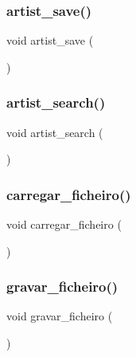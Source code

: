 \mbox{\label{project_8h_a8defa4fde9758146417715dd117615d2}} 
\subsubsection{artist\_save()}
{\footnotesize\ttfamily void artist\+\_\+save (\begin{DoxyParamCaption}{ }\end{DoxyParamCaption})}

\mbox{\label{project_8h_ac92bcae8044b83bc1a51fa19509f1979}} 
\subsubsection{artist\_search()}
{\footnotesize\ttfamily void artist\+\_\+search (\begin{DoxyParamCaption}{ }\end{DoxyParamCaption})}

\mbox{\label{project_8h_aa051eccd196b39b4cc6a67cc0367f198}} 
\subsubsection{carregar\_ficheiro()}
{\footnotesize\ttfamily void carregar\+\_\+ficheiro (\begin{DoxyParamCaption}{ }\end{DoxyParamCaption})}

\mbox{\label{project_8h_a66e40e3c4fe80bd64ffc8f71b2222486}} 
\subsubsection{gravar\_ficheiro()}
{\footnotesize\ttfamily void gravar\+\_\+ficheiro (\begin{DoxyParamCaption}{ }\end{DoxyParamCaption})}

\mbox{\label{project_8h_a94eb2f196131602051af1a66e7974225}} 
